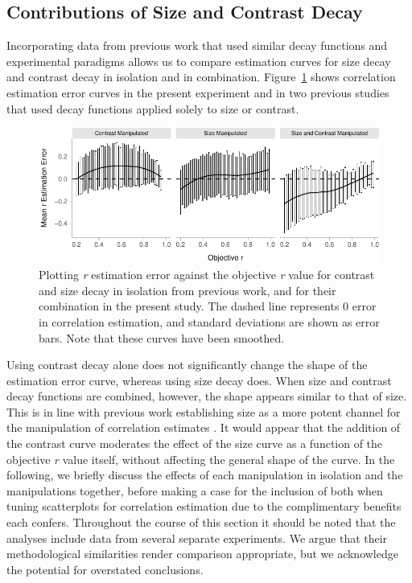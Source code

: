 \documentclass[manuscript, anonymous, screen]{acmart}
\begin{document}
\hypertarget{contributions-of-size-and-contrast-decay}{%
\subsection{Contributions of Size and Contrast
Decay}\label{contributions-of-size-and-contrast-decay}}

Incorporating data from previous work \citep{strain_2023, strain_2023b}
that used similar decay functions and experimental paradigms allows us
to compare estimation curves for size decay and contrast decay in
isolation and in combination. Figure~\ref{fig-est-multi-exp} shows
correlation estimation error curves in the present experiment and in two
previous studies that used decay functions applied solely to size or
contrast.

\begin{figure}

{\centering \includegraphics[width=1\textwidth,height=\textheight]{size_and_contrast_new_files/figure-pdf/fig-est-multi-exp-1.pdf}

}

\caption{\label{fig-est-multi-exp}Plotting \emph{r} estimation error
against the objective \emph{r} value for contrast and size decay in
isolation from previous work, and for their combination in the present
study. The dashed line represents 0 error in correlation estimation, and
standard deviations are shown as error bars. Note that these curves have
been smoothed.}

\end{figure}

Using contrast decay alone does not significantly change the shape of
the estimation error curve, whereas using size decay does. When size and
contrast decay functions are combined, however, the shape appears
similar to that of size. This is in line with previous work establishing
size as a more potent channel for the manipulation of correlation
estimates \citep{strain_2023b}. It would appear that the addition of the
contrast curve moderates the effect of the size curve as a function of
the objective \emph{r} value itself, without affecting the general shape
of the curve. In the following, we briefly discuss the effects of each
manipulation in isolation and the manipulations together, before making
a case for the inclusion of both when tuning scatterplots for
correlation estimation due to the complimentary benefits each confers.
Throughout the course of this section it should be noted that the
analyses include data from several separate experiments. We argue that
their methodological similarities render comparison appropriate, but we
acknowledge the potential for overstated conclusions.
\end{document}
